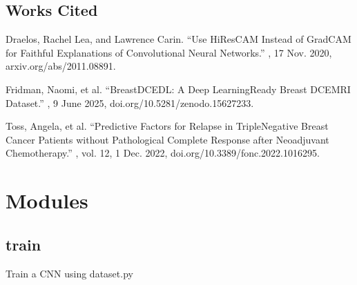 \documentclass[letterpaper,10pt,english]{sphinxmanual}
\begin{document}
\section{Works Cited}
\label{\detokenize{index:works-cited}}
\sphinxAtStartPar
Draelos, Rachel Lea, and Lawrence Carin. “Use HiResCAM Instead of Grad\sphinxhyphen{}CAM for Faithful Explanations of Convolutional Neural Networks.” , 17 Nov. 2020, arxiv.org/abs/2011.08891.

\sphinxAtStartPar
Fridman, Naomi, et al. “BreastDCEDL: A Deep Learning\textendash{}Ready Breast DCE\sphinxhyphen{}MRI Dataset.” , 9 June 2025, doi.org/10.5281/zenodo.15627233.

\sphinxAtStartPar
Toss, Angela, et al. “Predictive Factors for Relapse in Triple\sphinxhyphen{}Negative Breast Cancer Patients without Pathological Complete Response after Neoadjuvant Chemotherapy.” , vol. 12, 1 Dec. 2022, doi.org/10.3389/fonc.2022.1016295.

\sphinxstepscope


\chapter{Modules}
\label{\detokenize{modules:modules}}\label{\detokenize{modules::doc}}
\sphinxstepscope


\section{train}
\label{\detokenize{train:module-train}}\label{\detokenize{train:train}}\label{\detokenize{train::doc}}
\sphinxAtStartPar
Train a CNN using dataset.py
\end{document}
